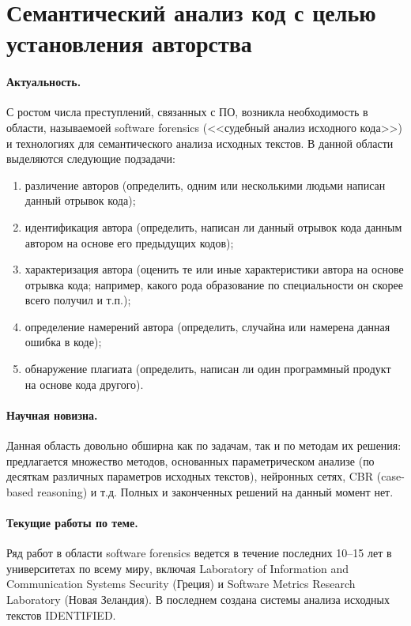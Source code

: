\documentclass[a4paper,12pt,notitlepage]{article}
\begin{document}
\section{Семантический анализ код с целью установления авторства}
\label{sec:saa}

\paragraph{Актуальность.}
С ростом числа преступлений, связанных с ПО, возникла необходимость в области, называемоей
software forensics (<<судебный анализ исходного кода>>) и технологиях для семантического
анализа исходных текстов. В данной области выделяются следующие подзадачи:
\begin{enumerate}
\item различение авторов (определить, одним или несколькими людьми написан данный отрывок кода);
\item идентификация автора (определить, написан ли данный отрывок кода данным автором на
  основе его предыдущих кодов);
\item характеризация автора (оценить те или иные характеристики автора на основе отрывка
  кода; например, какого рода образование по специальности он скорее всего получил и т.п.);
\item определение намерений автора (определить, случайна или намерена данная ошибка в коде);
\item обнаружение плагиата (определить, написан ли один программный продукт на основе кода
  другого).
\end{enumerate}

\paragraph{Научная новизна.}
Данная область довольно обширна как по задачам, так и по методам их решения: предлагается
множество методов, основанных параметрическом анализе (по десяткам различных параметров
исходных текстов), нейронных сетях, CBR (case-based reasoning) и т.д. Полных и законченных
решений на данный момент нет.

\paragraph{Текущие работы по теме.}
Ряд работ в области software forensics ведется в течение последних 10--15 лет в
университетах по всему миру, включая Laboratory of Information and Communication Systems
Security (Греция) и Software Metrics Research Laboratory (Новая Зеландия). В последнем
создана системы анализа исходных текстов IDENTIFIED.
\end{document}
